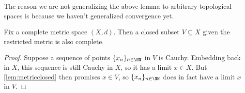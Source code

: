 \documentclass[../notes.tex]{subfiles}
\begin{document}
\begin{remark}
	The reason we are not generalizing the above lemma to arbitrary topological spaces is because we haven't generalized convergence yet.
\end{remark}
\begin{corollary} \label{cor:closediscomplete}
	Fix a complete metric space $(X,d)$. Then a closed subset $V\subseteq X$ given the restricted metric is also complete.
\end{corollary}
\begin{proof}
	Suppose a sequence of points $\{x_n\}_{n\in\NN}$ in $V$ is Cauchy. Embedding back in $X$, this sequence is still Cauchy in $X$, so it has a limit $x\in X$. But \autoref{lem:metricclosed} then promises $x\in V$, so $\{x_n\}_{n\in\NN}$ does in fact have a limit $x$ in $V$.
\end{proof}
\end{document}
